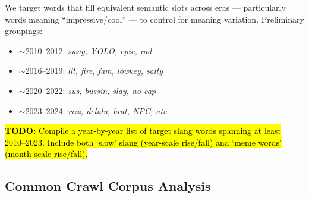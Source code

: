 \documentclass[11pt]{article}
\newcommand{\todo}[1]{\hl{\textbf{TODO:} #1}}
\begin{document}
We target words that fill equivalent semantic slots across eras --- particularly words meaning ``impressive/cool'' --- to control for meaning variation. Preliminary groupings:

\begin{itemize}
  \item $\sim$2010--2012: \textit{swag, YOLO, epic, rad}
  \item $\sim$2016--2019: \textit{lit, fire, fam, lowkey, salty}
  \item $\sim$2020--2022: \textit{sus, bussin, slay, no cap}
  \item $\sim$2023--2024: \textit{rizz, delulu, brat, NPC, ate}
\end{itemize}

\todo{Compile a year-by-year list of target slang words spanning at
least 2010--2023. Include both `slow' slang (year-scale rise/fall) and
`meme words' (month-scale rise/fall).}

\subsection{Common Crawl Corpus Analysis}
\label{sec:exp1-method}
\end{document}

